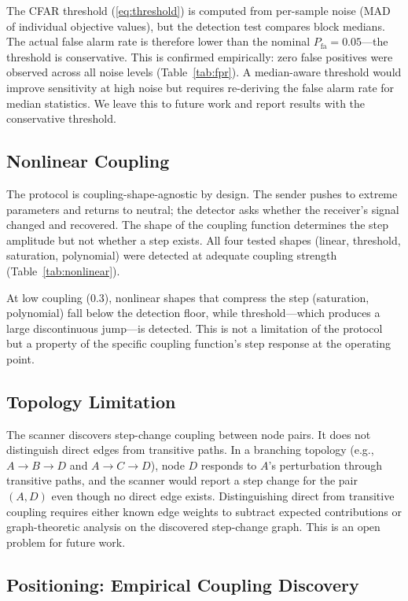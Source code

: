 The CFAR threshold (\ref{eq:threshold}) is computed from per-sample
noise (MAD of individual objective values), but the detection test
compares block medians. The actual false alarm rate is therefore
lower than the nominal $P_{\text{fa}} = 0.05$---the threshold is
conservative. This is confirmed empirically: zero false positives
were observed across all noise levels (Table~\ref{tab:fpr}). A
median-aware threshold would improve sensitivity at high noise but
requires re-deriving the false alarm rate for median statistics.
We leave this to future work and report results with the conservative
threshold.

\subsection{Nonlinear Coupling}

The protocol is coupling-shape-agnostic by design. The sender pushes
to extreme parameters and returns to neutral; the detector asks
whether the receiver's signal changed and recovered. The shape of
the coupling function determines the step amplitude but not whether
a step exists. All four tested shapes (linear, threshold, saturation,
polynomial) were detected at adequate coupling strength
(Table~\ref{tab:nonlinear}).

At low coupling ($0.3$), nonlinear shapes that compress the step
(saturation, polynomial) fall below the detection floor, while
threshold---which produces a large discontinuous jump---is detected.
This is not a limitation of the protocol but a property of the
specific coupling function's step response at the operating point.

\subsection{Topology Limitation}

The scanner discovers step-change coupling between node pairs. It
does not distinguish direct edges from transitive paths. In a
branching topology (e.g., $A \to B \to D$ and $A \to C \to D$),
node $D$ responds to $A$'s perturbation through transitive paths,
and the scanner would report a step change for the pair $(A, D)$
even though no direct edge exists. Distinguishing direct from
transitive coupling requires either known edge weights to subtract
expected contributions or graph-theoretic analysis on the discovered
step-change graph. This is an open problem for future work.

\subsection{Positioning: Empirical Coupling Discovery}

